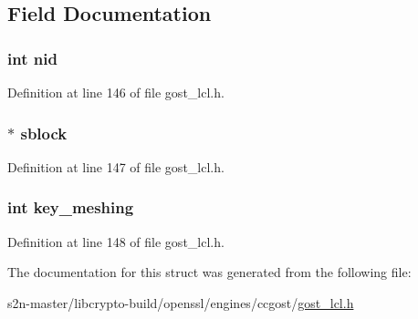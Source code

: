 \subsection{Field Documentation}
\subsubsection[{\texorpdfstring{nid}{nid}}]{\setlength{\rightskip}{0pt plus 5cm}int nid}\hypertarget{structgost__cipher__info_a7235ef62e89328f5155846dc59c6fc37}{}\label{structgost__cipher__info_a7235ef62e89328f5155846dc59c6fc37}


Definition at line 146 of file gost\+\_\+lcl.\+h.

\subsubsection[{\texorpdfstring{sblock}{sblock}}]{$\ast$ sblock}\hypertarget{structgost__cipher__info_a65a9a4736866b0afb07e3e6a093054d8}{}\label{structgost__cipher__info_a65a9a4736866b0afb07e3e6a093054d8}


Definition at line 147 of file gost\+\_\+lcl.\+h.

\subsubsection[{\texorpdfstring{key\+\_\+meshing}{key_meshing}}]{\setlength{\rightskip}{0pt plus 5cm}int key\+\_\+meshing}\hypertarget{structgost__cipher__info_a0d26c1455c49156afaa4c8194010ed56}{}\label{structgost__cipher__info_a0d26c1455c49156afaa4c8194010ed56}


Definition at line 148 of file gost\+\_\+lcl.\+h.



The documentation for this struct was generated from the following file\+:\begin{DoxyCompactItemize}
\item 
s2n-\/master/libcrypto-\/build/openssl/engines/ccgost/\hyperlink{gost__lcl_8h}{gost\+\_\+lcl.\+h}\end{DoxyCompactItemize}
